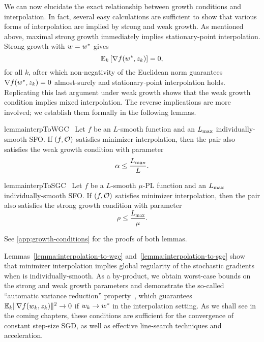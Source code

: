 We can now elucidate the exact relationship between growth conditions and interpolation.
In fact, several easy calculations are sufficient to show that various forms of interpolation are implied by strong and weak growth.
As mentioned above, maximal strong growth immediately implies stationary-point interpolation.
Strong growth with \( \w = \wopt \) gives  
\[ \E_k\sbr{\grad(\wopt, \zk)} = 0, \] 
for all \( k \), after which non-negativity of the Euclidean norm guarantees \( \grad(\wopt, \zk) = 0 \) almost-surely and stationary-point interpolation holds.
Replicating this last argument under weak growth shows that the weak growth condition implies mixed interpolation.
The reverse implications are more involved; we establish them formally in the following lemmas. 
\begin{restatable}{lemma}{interpToWGC}~\label{lemma:interpolation-to-wgc}
    Let \( f \) be an \( L \)-smooth function and \oracle{} an \( \Lmax \) individually-smooth \ac{SFO}.
    If \( \rbr{f, \oracle{}} \) satisfies minimizer interpolation, then the pair also satisfies the weak growth condition with parameter
    \[ \wgc \leq \frac{L_{\text{max}}}{L}. \]
\end{restatable}

\begin{restatable}{lemma}{interpToSGC}~\label{lemma:interpolation-to-sgc}
    Let \( f \) be a \( L \)-smooth  \( \mu \)-PL function and \oracle{} an \( \Lmax \) individually-smooth \ac{SFO}.
    If \( \rbr{f, \oracle{}} \) satisfies minimizer interpolation, then the pair also satisfies the strong growth condition with parameter
    \[ \rho \leq \frac{L_{\text{max}}}{\mu}. \]
\end{restatable}
\noindent See \autoref{app:growth-conditions} for the proofs of both lemmas. \hfill \break

Lemmas~\ref{lemma:interpolation-to-wgc} and~\ref{lemma:interpolation-to-sgc} show that minimizer interpolation implies global regularity of the stochastic gradients when \oracle{} is individually-smooth. 
As a by-product, we obtain worst-case bounds on the strong and weak growth parameters and demonstrate the so-called ``automatic variance reduction'' property~\citep{liu2020accelerating}, which guarantees \( \E_k\norm{\grad(\wk, \zk)}^2 \rightarrow 0 \) if \( \wk \rightarrow \wopt \) in the interpolation setting.
As we shall see in the coming chapters, these conditions are sufficient for the convergence of constant step-size \ac{SGD}, as well as effective line-search techniques and acceleration. 
